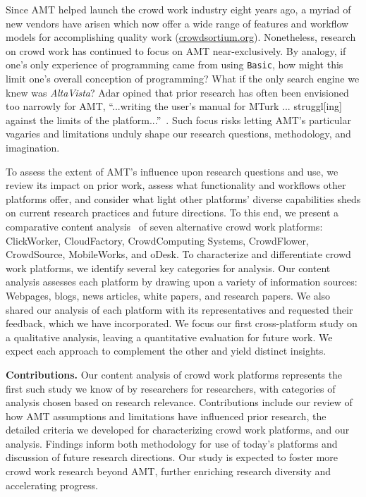 \documentclass{sigchi}
\begin{document}
Since AMT helped launch the crowd work industry eight years ago, 
a myriad of new vendors have arisen which now offer a wide range of features and workflow models for accomplishing quality work (\url{crowdsortium.org}). Nonetheless, research on crowd work has continued to focus on AMT near-exclusively. By analogy, if one's only experience of programming came from using {\tt Basic}, how might this limit one's overall conception of programming? What if the only search engine we knew was {\it AltaVista}? Adar opined that prior research has often been envisioned too narrowly for AMT, ``...writing the user's manual for MTurk ... struggl[ing] against the limits of the platform...''~\cite{adar2011hate}. Such focus risks letting AMT's particular vagaries and limitations unduly shape our research questions, methodology, and imagination.

To assess the extent of AMT's influence upon research questions and use, we review its impact on prior work, assess what functionality and workflows other platforms offer, and consider what light other platforms' diverse capabilities sheds on current research practices and future directions. To this end, we present a comparative content analysis~\cite{mayring2000qualitative} of seven alternative crowd work platforms: ClickWorker, CloudFactory, CrowdComputing Systems, 
CrowdFlower, CrowdSource, MobileWorks, and oDesk. 
To characterize and differentiate crowd work platforms, we identify several key categories for analysis. Our content analysis assesses each platform by drawing upon a variety of information sources: Webpages, blogs, news articles, white papers, and research papers. We also shared our analysis of each platform with its representatives and requested their feedback, which we have incorporated. We focus our first cross-platform study on a qualitative analysis, leaving a quantitative evaluation for future work. We expect each approach to complement the other and yield distinct insights.



 




{\bf Contributions.} 
Our content analysis of crowd work platforms represents the first such study we know of by researchers for researchers, with categories of analysis chosen based on research relevance. Contributions include our review of how AMT assumptions and limitations have influenced prior research, the detailed criteria we developed for characterizing crowd work platforms, and our analysis. 
Findings inform both methodology for use of today's platforms and discussion of future research directions. Our study is expected to foster more crowd work research beyond AMT, 
further enriching research diversity and accelerating progress.
\end{document}
